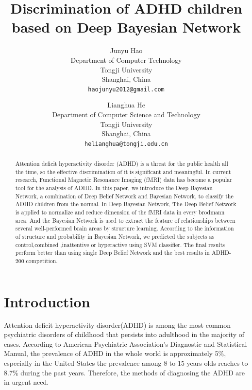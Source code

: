 \documentclass[10pt,twocolumn,letterpaper]{article}
\begin{document}
\title{Discrimination of ADHD children based on Deep Bayesian Network}

\author{Junyu Hao\\
Department of Computer Technology\\
Tongji University\\
Shanghai, China\\
{\tt\small haojunyu2012@gmail.com}
\and
Lianghua He\\
Department of Computer Science and Technology\\
Tongji University\\
Shanghai, China\\
{\tt\small helianghua@tongji.edu.cn}
}

\maketitle


\begin{abstract}
   Attention deficit hyperactivity disorder (ADHD) is a threat for the public health all the time, so the effective discrimination of it is significant and meaningful. In current research, Functional Magnetic Resonance Imaging (fMRI) data has become a popular tool for the analysis of ADHD. In this paper, we introduce the Deep Bayesian Network, a combination of Deep Belief Network and Bayesian Network, to classify the ADHD children from the normal. In Deep Bayesian Network, The Deep Belief Network is applied to  normalize and reduce dimension of the fMRI data in every brodmann area. And the Bayesian Network is used to extract the feature of relationships between several well-performed brain areas by structure learning. According to the information of structure and probability in Bayesian Network, we predicted the subjects as control,combined ,inattentive or hyperactive using SVM classifier. The final results perform better than using single Deep Belief Network and the best results in ADHD-200 competition. 

\end{abstract}

\section{Introduction}
Attention deficit hyperactivity disorder(ADHD) is among the most common psychiatric disorders of childhood that persists into adulthood in the majority of cases\cite{1}. According to American Psychiatric Association's Diagnostic and Statistical Manual, the prevalence of ADHD in the whole world is approximately 5\%, especially in the United States the prevalence among 8 to 15-years-olds reaches to 8.7\% during the past years. Therefore, the methods of diagnosing the ADHD are in urgent need.
 
\end{document}
